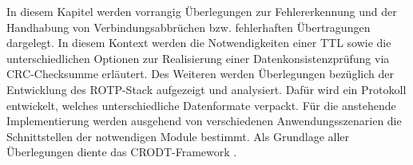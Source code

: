 \label{cap:konzept}

In diesem Kapitel werden vorrangig {\"U}berlegungen zur Fehlererkennung
und der Handhabung von Verbindungsabbr{\"u}chen bzw. fehlerhaften
{\"U}bertragungen dargelegt. In diesem Kontext werden die Notwendigkeiten einer
\gls{TTL} sowie die unterschiedlichen Optionen zur
Realisierung einer Datenkonsistenzpr{\"u}fung via CRC-Checksumme erl{\"a}utert.
Des Weiteren werden {\"U}berlegungen bez{\"u}glich der Entwicklung des
\gls{ROTP}-Stack aufgezeigt und analysiert. Dafür wird ein Protokoll
entwickelt, welches unterschiedliche Datenformate verpackt. Für die anstehende
Implementierung werden ausgehend von verschiedenen Anwendungsszenarien die
Schnittstellen der notwendigen Module bestimmt. Als Grundlage aller
{\"U}berlegungen diente das CRODT-Framework \cite{Daher}.
